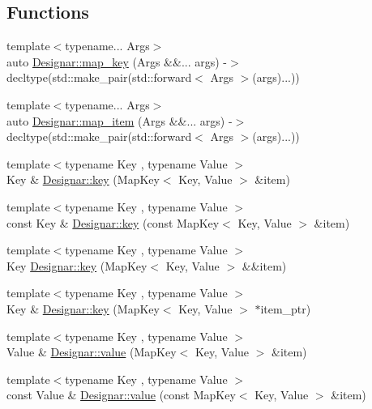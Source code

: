 \subsection*{Functions}
\begin{DoxyCompactItemize}
\item 
{\footnotesize template$<$typename... Args$>$ }\\auto \hyperlink{namespace_designar_ae056f21d6632882d928c2452439836c9}{Designar\+::map\+\_\+key} (Args \&\&... args) -\/$>$ decltype(std\+::make\+\_\+pair(std\+::forward$<$ Args $>$(args)...))
\item 
{\footnotesize template$<$typename... Args$>$ }\\auto \hyperlink{namespace_designar_a1a0ef2d0cfea5299ec7b7ecf420665f2}{Designar\+::map\+\_\+item} (Args \&\&... args) -\/$>$ decltype(std\+::make\+\_\+pair(std\+::forward$<$ Args $>$(args)...))
\item 
{\footnotesize template$<$typename Key , typename Value $>$ }\\Key \& \hyperlink{namespace_designar_ae26ed0e58d724f576ed6faecb606265b}{Designar\+::key} (Map\+Key$<$ Key, Value $>$ \&item)
\item 
{\footnotesize template$<$typename Key , typename Value $>$ }\\const Key \& \hyperlink{namespace_designar_aa8f8b118fb59d977b693196954abca76}{Designar\+::key} (const Map\+Key$<$ Key, Value $>$ \&item)
\item 
{\footnotesize template$<$typename Key , typename Value $>$ }\\Key \hyperlink{namespace_designar_a02dd98d2c308a1eb7f11ec2e5cb1b382}{Designar\+::key} (Map\+Key$<$ Key, Value $>$ \&\&item)
\item 
{\footnotesize template$<$typename Key , typename Value $>$ }\\Key \& \hyperlink{namespace_designar_afbf77bb89fda57c01717bcff7290fa1b}{Designar\+::key} (Map\+Key$<$ Key, Value $>$ $\ast$item\+\_\+ptr)
\item 
{\footnotesize template$<$typename Key , typename Value $>$ }\\Value \& \hyperlink{namespace_designar_a7dd2a7b6d96f664ce612b506c8eb2fb8}{Designar\+::value} (Map\+Key$<$ Key, Value $>$ \&item)
\item 
{\footnotesize template$<$typename Key , typename Value $>$ }\\const Value \& \hyperlink{namespace_designar_a0b1fbaad8d9cadc07bd73cd65baf6b3f}{Designar\+::value} (const Map\+Key$<$ Key, Value $>$ \&item)

\end{DoxyCompactItemize}
